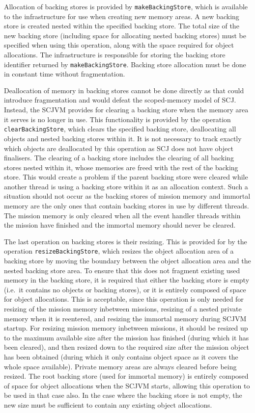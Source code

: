 Allocation of backing stores is provided by
\texttt{make\-Backing\-Store}, which is available to the
infrastructure for use when creating new memory areas.
A new backing store is created nested within the specified backing
store.
The total size of the new backing store (including space for
allocating nested backing stores) must be specified when using this
operation, along with the space required for object allocations.
The infrastructure is responsible for storing the backing store
identifier returned by \texttt{make\-Backing\-Store}.
Backing store allocation must be done in constant time without
fragmentation.

Deallocation of memory in backing stores cannot be done directly as
that could introduce fragmentation and would defeat the scoped-memory
model of SCJ.
Instead, the SCJVM provides for clearing a backing store when the
memory area it serves is no longer in use.
This functionality is provided by the operation
\texttt{clear\-Backing\-Store}, which clears the specified backing
store, deallocating all objects and nested backing stores within it.
It is not necessary to track exactly which objects are deallocated by
this operation as SCJ does not have object finalisers.
The clearing of a backing store includes the clearing of all backing
stores nested within it, whose memories are freed with the rest of the
backing store.
This would create a problem if the parent backing store were cleared
while another thread is using a backing store within it as an
allocation context.
Such a situation should not occur as the backing stores of mission
memory and immortal memory are the only ones that contain backing
stores in use by different threads.
The mission memory is only cleared when all the event handler threads
within the mission have finished and the immortal memory should never
be cleared.

The last operation on backing stores is their resizing.
This is provided for by the operation \texttt{resizeBackingStore},
which resizes the object allocation area of a backing store by moving
the boundary between the object allocation area and the nested backing
store area.
To ensure that this does not fragment existing used memory in the
backing store, it is required that either the backing store is empty
(i.e.\ it contains no objects or backing stores), or it is entirely
composed of space for object allocations.
This is acceptable, since this operation is only needed for resizing
of the mission memory inbetween missions, resizing of a nested private
memory when it is reentered, and resizing the immortal memory during
SCJVM startup.
For resizing mission memory inbetween missions, it should be resized
up to the maximum available size after the mission has finished
(during which it has been cleared), and then resized down to the
required size after the mission object has been obtained (during which
it only contains object space as it covers the whole space available).
Private memory areas are always cleared before being resized.
The root backing store (used for immortal memory) is entirely composed
of space for object allocations when the SCJVM starts, allowing this
operation to be used in that case also.
In the case where the backing store is not empty, the new size must be
sufficient to contain any existing object allocations.

